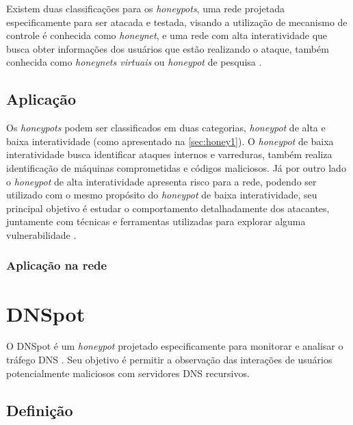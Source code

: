 Existem duas classificações para os \textit{honeypots}, uma rede projetada especificamente para ser atacada e testada, visando a utilização de mecanismo de controle é conhecida como \textit{honeynet}, e uma rede com alta interatividade que busca obter informações dos usuários que estão realizando o ataque, também conhecida como \textit{honeynets virtuais} ou \textit{honeypot} de pesquisa \cite{honey:2007}.

\subsection{Aplicação}

Os \textit{honeypots} podem ser classificados em duas categorias, \textit{honeypot} de alta e baixa interatividade (como apresentado na \ref{sec:honey1}). O \textit{honeypot} de baixa interatividade busca identificar ataques internos e varreduras, também realiza identificação de máquinas comprometidas e códigos maliciosos. Já por outro lado o \textit{honeypot} de alta interatividade apresenta risco para a rede, podendo ser utilizado com o mesmo propósito do \textit{honeypot}  de baixa interatividade, seu principal objetivo é estudar o comportamento  detalhadamente dos atacantes, juntamente com técnicas e ferramentas utilizadas para explorar alguma vulnerabilidade \cite{honey:2007}.

 

\subsubsection{Aplicação na rede}    


\section{DNSpot}
\label{sec:introDNSpot}

O DNSpot é um \textit{honeypot} projetado especificamente para monitorar e analisar o tráfego DNS \cite{Longo:2015:tcc}. Seu objetivo é permitir a observação das interações de usuários potencialmente maliciosos com servidores DNS recursivos. %


\subsection{Definição}
\label{sec:defiDNSpot}


